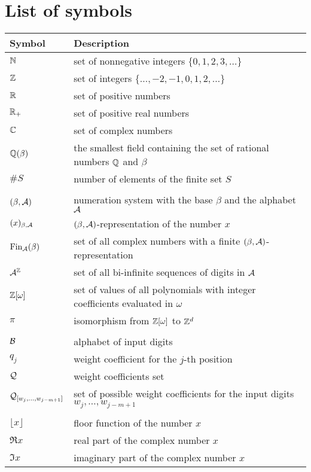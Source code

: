 \chapter*{List of symbols}
\begin{tabular}{ll}
Symbol        & Description \\ \hline
$\mathbb{N}$         & set of nonnegative integers $\{0,1,2,3,\dots\}$   \\
$\mathbb{Z}$         & set of integers $\{\dots,-2,-1,0,1,2,\dots\}$ \\
$\mathbb{R}$           & set of positive numbers \\
$\mathbb{R}_+$           & set of positive real numbers \\
$\mathbb{C}$           & set of complex numbers \\
$\mathbb{Q}(\beta)$    &the smallest field containing the set of rational numbers $\mathbb{Q}$ and $\beta$ \\
$\#S$          & number of elements of the finite set $S$ \\
\rule{0cm}{0cm}& \\
$(\beta,\mathcal{A})$            & numeration system with the base $\beta$ and the alphabet $\mathcal{A}$\\
$(x)_{\beta,\mathcal{A}}$    &$(\beta,\mathcal{A})$-representation of the number $x$\\
$\text{Fin}_{\mathcal{A}}(\beta)$          &set of all complex numbers with a finite $(\beta,\mathcal{A})$-representation \\
$\mathcal{A}^{\mathbb{Z}}$        &set of all bi-infinite sequences of digits in $\mathcal{A}$\\
$\mathbb{Z}[\omega]$       &set of values of all polynomials with integer coefficients evaluated in $\omega$\\
$\pi$           &isomorphism from $\mathbb{Z}[\omega]$ to $\mathbb{Z}^d$ \\
\rule{0cm}{0cm}& \\
$\mathcal{B}$            &alphabet of input digits\\
$q_j$           &weight coefficient for the $j$-th position \\
$\mathcal{Q}$            &weight coefficients set\\
$\mathcal{Q}_{[w_{j},\dots, w_{j-m+1}]}$ &set of possible weight coefficients for the input digits $w_{j},\dots, w_{j-m+1}$ \\
\rule{0cm}{0cm}& \\
$\lfloor x \rfloor$ & floor function of the number $x$ \\  
$\Re x$           & real part of the complex number $x$ \\
$\Im x$           & imaginary part of the complex number $x$
\end{tabular}